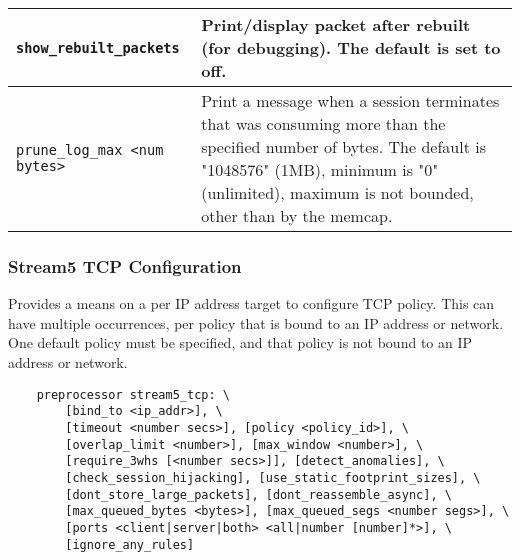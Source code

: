 \documentclass[english]{report}
\begin{document}
\begin{center}
\begin{tabular}{| l | p{4.5in} |}
\hline
\texttt{show\_rebuilt\_packets} &

Print/display packet after rebuilt (for debugging).  The default is set to
off.\\

\hline
\texttt{prune\_log\_max <num bytes>} &

Print a message when a session terminates that was consuming more than the
specified number of bytes.  The default is "1048576" (1MB), minimum is "0"
(unlimited), maximum is not bounded, other than by the memcap.\\

\hline
\end{tabular}
\end{center}

\subsubsection{Stream5 TCP Configuration}

Provides a means on a per IP address target to configure TCP policy.  This can
have multiple occurrences, per policy that is bound to an IP address or network.
One default policy must be specified, and that policy is not bound to an IP
address or network.

\begin{verbatim}
    preprocessor stream5_tcp: \
        [bind_to <ip_addr>], \
        [timeout <number secs>], [policy <policy_id>], \
        [overlap_limit <number>], [max_window <number>], \
        [require_3whs [<number secs>]], [detect_anomalies], \
        [check_session_hijacking], [use_static_footprint_sizes], \
        [dont_store_large_packets], [dont_reassemble_async], \
        [max_queued_bytes <bytes>], [max_queued_segs <number segs>], \
        [ports <client|server|both> <all|number [number]*>], \
        [ignore_any_rules]
\end{verbatim}
\end{document}
